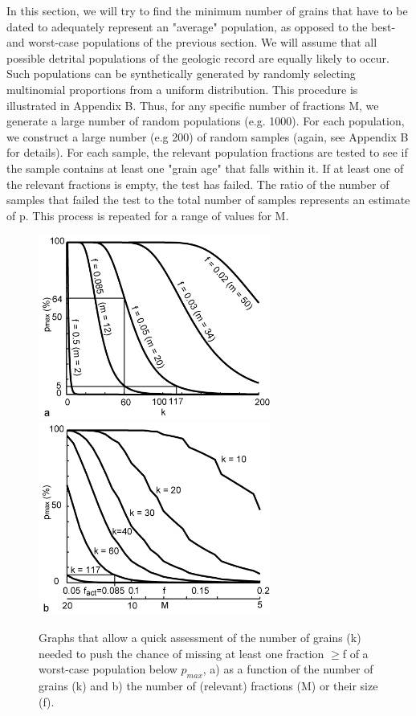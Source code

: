 \documentclass[12]{article}
\begin{document}
In this section, we will try to find the minimum number of grains that
have to be  dated to adequately represent an  "average" population, as
opposed  to  the best-  and  worst-case  populations  of the  previous
section.  We will assume that all possible detrital populations of the
geologic record are equally likely  to occur.  Such populations can be
synthetically generated by  randomly selecting multinomial proportions
from a uniform distribution. This procedure is illustrated in Appendix
B.  Thus, for any specific number  of fractions M, we generate a large
number of  random populations (e.g.   1000).  For each  population, we
construct  a large  number (e.g  200)  of random  samples (again,  see
Appendix  B for details).   For each  sample, the  relevant population
fractions are tested to see if the sample contains at least one "grain
age" that falls within it.  If  at least one of the relevant fractions
is empty,  the test has  failed.  The ratio  of the number  of samples
that  failed the test  to the  total number  of samples  represents an
estimate of p. This process is repeated for a range of values for M.

\begin{figure}[here]
  \centering
  \includegraphics[width=3in]{fig3a.jpg}
  \includegraphics[width=3in]{fig3b.jpg}
  \caption{Graphs that allow a quick assessment of the number of grains
  (k)  needed to  push the  chance of  missing at  least  one fraction
  $\geq$f of a worst-case population below $p_{max}$, a) as a function
  of  the  number  of grains  (k)  and  b)  the number  of  (relevant)
  fractions (M) or their size (f).}
  \label{fig:3}
\end{figure}
\end{document}
